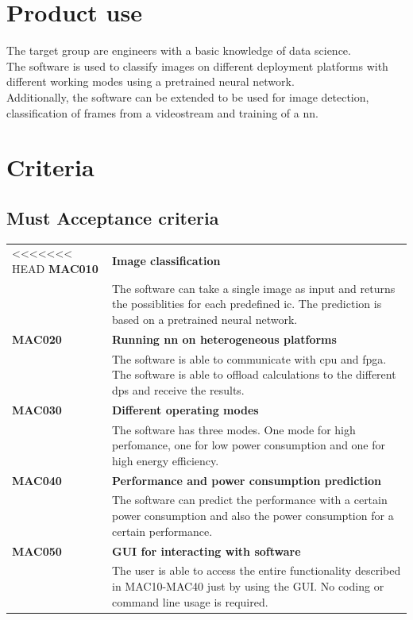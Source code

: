 \documentclass[parskip=full]{scrartcl}
\begin{document}
\section{Product use}
The target group are engineers with a basic knowledge of data science.\\
The software is used to classify images on different deployment platforms with different working modes using a pretrained neural network.\\
Additionally, the software can be extended to be used for image detection, classification of frames from a videostream and training of a \gls{nn}.\\


\section{Criteria}
\subsection{Must Acceptance criteria}
\begin{tabular}{p{2cm}p{12cm}}
<<<<<<< HEAD
\textbf{MAC010} & \textbf{Image classification} \\
& The software can take a single image as input and returns the possiblities for each predefined \gls{ic}. The prediction is based on a pretrained neural network.\\
\textbf{MAC020} & \textbf{Running \gls{nn} on heterogeneous platforms} \\
& The software is able to communicate with \gls{cpu} and \gls{fpga}. The software is able to offload calculations to the different \glspl{dp} and receive the results.\\
\textbf{MAC030} & \textbf{Different operating modes} \\
& The software has three modes. One mode for high perfomance, one for low \gls{power consumption} and one for high energy efficiency. \\
\textbf{MAC040} & \textbf{Performance and \gls{power consumption} prediction}\\
& The software can predict the \gls{performance} with a certain \gls{power consumption} and also the \gls{power consumption} for a certain \gls{performance}.\\
\textbf{MAC050} & \textbf{GUI for interacting with software} \\
& The user is able to access the entire functionality described in MAC10-MAC40 just by using the GUI. No coding or command line usage is required.
\end{tabular}
\end{document}
